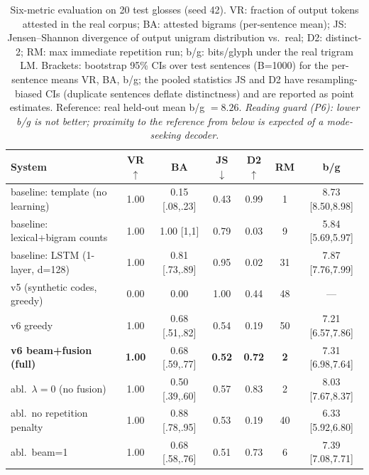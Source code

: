 \documentclass[10pt,twocolumn]{article}
\begin{document}
\begin{table}[t]
\centering
\small
\caption{Six-metric evaluation on 20 test glosses (seed 42). VR:
fraction of output tokens attested in the real corpus; BA: attested
bigrams (per-sentence mean); JS: Jensen--Shannon divergence of output
unigram distribution vs.\ real; D2: distinct-2; RM: max immediate
repetition run; b/g: bits/glyph under the real trigram LM. Brackets:
bootstrap 95\% CIs over test sentences (B=1000) for the per-sentence
means VR, BA, b/g; the pooled statistics JS and D2 have
resampling-biased CIs (duplicate sentences deflate distinctness) and
are reported as point estimates. Reference: real held-out mean b/g
$=8.26$. \emph{Reading guard (P6): lower b/g is not better; proximity
to the reference from below is expected of a mode-seeking decoder.}}
\label{tab:eval}
\begin{tabular}{lcccccc}
\toprule
System & VR$\uparrow$ & BA & JS$\downarrow$ & D2$\uparrow$ & RM & b/g\\
\midrule
baseline: template (no learning) & 1.00 & 0.15 [.08,.23] & 0.43 & 0.99 & 1 & 8.73 [8.50,8.98]\\
baseline: lexical+bigram counts & 1.00 & 1.00 [1,1] & 0.79 & 0.03 & 9 & 5.84 [5.69,5.97]\\
baseline: LSTM (1-layer, d=128) & 1.00 & 0.81 [.73,.89] & 0.95 & 0.02 & 31 & 7.87 [7.76,7.99]\\
v5 (synthetic codes, greedy) & 0.00 & 0.00 & 1.00 & 0.44 & 48 & ---\\
v6 greedy & 1.00 & 0.68 [.51,.82] & 0.54 & 0.19 & 50 & 7.21 [6.57,7.86]\\
\textbf{v6 beam+fusion (full)} & \textbf{1.00} & 0.68 [.59,.77] & \textbf{0.52} & \textbf{0.72} & \textbf{2} & 7.31 [6.98,7.64]\\
\midrule
abl.\ $\lambda=0$ (no fusion) & 1.00 & 0.50 [.39,.60] & 0.57 & 0.83 & 2 & 8.03 [7.67,8.37]\\
abl.\ no repetition penalty & 1.00 & 0.88 [.78,.95] & 0.53 & 0.19 & 40 & 6.33 [5.92,6.80]\\
abl.\ beam=1 & 1.00 & 0.68 [.58,.76] & 0.51 & 0.73 & 6 & 7.39 [7.08,7.71]\\
\bottomrule
\end{tabular}
\end{table}
\end{document}
